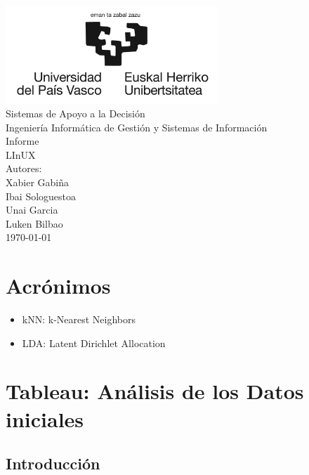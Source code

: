 \documentclass{report}
\begin{document}
    \begin{titlepage}
        \centering
        \includegraphics[width=0.6\textwidth]{./img/logo.jpg}\\
        \vspace{1cm}
        \LARGE Sistemas de Apoyo a la Decisión\\
        \vspace{0.5cm}
        \Large Ingeniería Informática de Gestión y Sistemas de Información\\
        \vspace{3cm}
        \Huge Informe\\
        \huge LInUX\\
        \vspace{2.5cm}
        \Large Autores:\\
        \vspace{0.2cm}
        \large Xabier Gabiña\\
        \large Ibai Sologuestoa\\
        \large Unai Garcia\\
        \large Luken Bilbao\\
        \vfill
        \today
    \end{titlepage}
    \tableofcontents
    \listoffigures
    \listoftables
    \chapter*{Acrónimos}
        \begin{itemize}
            \item kNN: k-Nearest Neighbors
            \item LDA: Latent Dirichlet Allocation
        \end{itemize}
    \chapter{Tableau: Análisis de los Datos iniciales}
        \section{Introducción}
\end{document}
